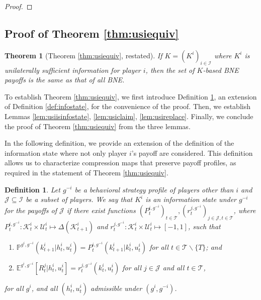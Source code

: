 \documentclass[pdflatex,sn-basic]{sn-jnl}
\newcommand{\E}{\mathbb{E}}
\renewcommand{\Pr}{\mathbb{P}}
\newcommand{\Comp}{K}
\newcommand{\comp}{k}
\newcommand{\Compset}{\mathcal{K}}
\theoremstyle{thmstyleone}%
\newtheorem{thm}{Theorem}
\theoremstyle{thmstyletwo}%
\theoremstyle{thmstylethree}%
\newtheorem{defn}{Definition}
\begin{document}
\begin{appendices}
\begin{proof}
\end{proof}
 
\subsection{Proof of Theorem \ref{thm:usiequiv}}\label{app:thm:usiequiv}
\begin{thm}[Theorem \ref{thm:usiequiv}, restated]
	If $\Comp=(\Comp^i)_{i\in\mathcal{I}}$ where $\Comp^i$ is unilaterally sufficient information for player $i$, then the set of $\Comp$-based BNE payoffs is the same as that of all BNE.
\end{thm}

{
To establish Theorem \ref{thm:usiequiv}, we first introduce Definition \ref{def:infostateforj}, an extension of Definition \ref{def:infostate}, for the convenience of the proof. Then, we establish Lemmas \ref{lem:usiisinfostate}, \ref{lem:usiclaim}, \ref{lem:usireplace}. Finally, we conclude the proof of Theorem \ref{thm:usiequiv} from the three lemmas.}

{In the following definition, we provide an extension of the definition of the information state where not only player $i$'s payoff are considered. This definition allows us to characterize compression maps that preserve payoff profiles, as required in the statement of Theorem \ref{thm:usiequiv}.}

\begin{defn}\label{def:infostateforj}
	Let $g^{-i}$ be a behavioral strategy profile of players other than $i$ and $\mathcal{J}\subseteq \mathcal{I}$ be a subset of players. We say that $\Comp^i$ is an \emph{information state under $g^{-i}$ for the payoffs of $\mathcal{J}$} if there exist functions $(P_t^{i,g^{-i}})_{t\in\mathcal{T}}, (r_t^{j,g^{-i}})_{j\in\mathcal{J}, t\in\mathcal{T}}$, where $P_t^{i,g^{-i}}: \Compset_t^i\times \mathcal{U}_t^i \mapsto \Delta(\Compset_{t+1}^i)$ and $r_t^{j,g^{-i}}: \Compset_t^i\times \mathcal{U}_t^i \mapsto [-1, 1]$, such that
	\begin{enumerate}[(1)]
		\item $\Pr^{g^i, g^{-i}}(\comp_{t+1}^i|h_t^i, u_t^i) = P_t^{i,g^{-i}}(\comp_{t+1}^i|\comp_t^i, u_t^i)$ for all $t\in\mathcal{T}\backslash\{T\}$; and
		\item $\E^{g^i, g^{-i}}[R_t^j|h_t^i, u_t^i] = r_t^{j,g^{-i}}(\comp_t^i, u_t^i)$ for all $j\in\mathcal{J}$ and all $t\in \mathcal{T}$,
	\end{enumerate}
	for all $g^i$, and all $(h_t^i, u_t^i)$ admissible under $(g^i, g^{-i})$.
\end{defn}


\end{appendices}
\end{document}
